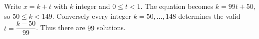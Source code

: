 Write $x=k+t$ with $k$ integer and $0\le t<1$. The equation becomes $k=99t+50$, so $50\le k<149$. Conversely every integer $k=50,\ldots,148$ determines the valid $t=\dfrac{k-50}{99}$. Thus there are $\boxed{99}$ solutions.
